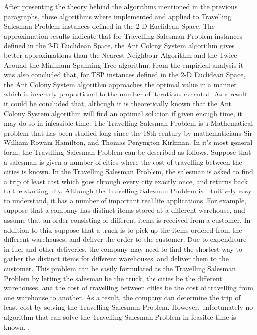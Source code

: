 \documentclass[12pt]{article}
\numberwithin{equation}{subsection}
\numberwithin{table}{subsection}
\numberwithin{algorithm}{subsection}
\numberwithin{figure}{subsection}
\begin{document}
After presenting the theory behind the algorithms mentioned in the previous paragraphs, these algorithms where implemented and applied to Travelling Salesman Problem instances defined in the 2-D Euclidean Space. The approximation results indicate that for Travelling Salesman Problem instances defined in the 2-D Euclidean Space, the Ant Colony System algorithm gives better approximations than the Nearest Neighbour Algorithm and the Twice Around the Minimum Spanning Tree algorithm. From the empirical analysis it was also concluded that, for TSP instances defined in the 2-D Euclidean Space, the Ant Colony System algorithm approaches the optimal value in a manner which is inversely proportional to the number of iterations executed. As a result it could be concluded that, although it is theoretically known that the Ant Colony System algorithm will find an optimal solution if given enough time, it may do so in infeasible time.
\newpage
\tableofcontents
\newpage
{}
{}
The Travelling Salesman Problem is a Mathematical problem that has been studied long since the 18th century by mathematicians Sir William Rowam Hamilton, and Thomas Penyngton Kirkman. In it's most general form, the Travelling Salesman Problem can be described as follows. Suppose that a salesman is given a number of cities where the cost of travelling between the cities is known. In the Travelling Salesman Problem, the salesman is asked to find a trip of least cost which goes through every city exactly once, and returns back to the starting city. Although the Travelling Salesman Problem is intuitively easy to understand, it has a number of important real life applications. For example, suppose that a company has distinct items stored at a different warehouse, and assume that an order consisting of different items is received from a customer. In addition to this, suppose that a truck is to pick up the items ordered from the different warehouses, and deliver the order to the customer. Due to expenditure in fuel and other deliveries, the company may need to find the shortest way to gather the distinct items for different warehouses, and deliver them to the customer. This problem can be easily formulated as the Travelling Salesman Problem by letting the salesman be the truck, the cities be the different warehouses, and the cost of travelling between cities be the cost of travelling from one warehouse to another. As a result, the company can determine the trip of least cost by solving the Travelling Salesman Problem. However,  unfortunately no algorithm that can solve the Travelling Salesman Problem in feasible time is known. \cite{dorigo_stutzle_thomas_2004}, \cite{Matai10}\\\\
\end{document}
